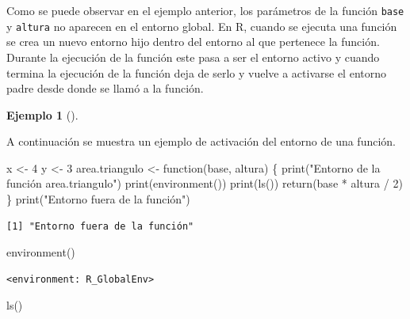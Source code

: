\documentclass[
  a4paper,
]{scrreport}
\newenvironment{Shaded}{\begin{snugshade}}{\end{snugshade}}
\newcommand{\ControlFlowTok}[1]{\textcolor[rgb]{0.00,0.23,0.31}{#1}}
\newcommand{\DecValTok}[1]{\textcolor[rgb]{0.68,0.00,0.00}{#1}}
\newcommand{\FunctionTok}[1]{\textcolor[rgb]{0.28,0.35,0.67}{#1}}
\newcommand{\NormalTok}[1]{\textcolor[rgb]{0.00,0.23,0.31}{#1}}
\newcommand{\OtherTok}[1]{\textcolor[rgb]{0.00,0.23,0.31}{#1}}
\newcommand{\SpecialCharTok}[1]{\textcolor[rgb]{0.37,0.37,0.37}{#1}}
\newcommand{\StringTok}[1]{\textcolor[rgb]{0.13,0.47,0.30}{#1}}
\theoremstyle{definition}
\newtheorem{example}{Ejemplo}[chapter]
\theoremstyle{definition}
\theoremstyle{remark}
\begin{document}
Como se puede observar en el ejemplo anterior, los parámetros de la
función \texttt{base} y \texttt{altura} no aparecen en el entorno
global. En R, cuando se ejecuta una función se crea un nuevo entorno
hijo dentro del entorno al que pertenece la función. Durante la
ejecución de la función este pasa a ser el entorno activo y cuando
termina la ejecución de la función deja de serlo y vuelve a activarse el
entorno padre desde donde se llamó a la función.

\leavevmode{}%
\begin{example}[]\label{exm-activacion-entorno-funcion}

A continuación se muestra un ejemplo de activación del entorno de una
función.

\begin{Shaded}
\begin{Highlighting}[]
\NormalTok{x }\OtherTok{\textless{}{-}} \DecValTok{4}
\NormalTok{y }\OtherTok{\textless{}{-}} \DecValTok{3}
\NormalTok{area.triangulo }\OtherTok{\textless{}{-}} \ControlFlowTok{function}\NormalTok{(base, altura) \{}
  \FunctionTok{print}\NormalTok{(}\StringTok{"Entorno de la función area.triangulo"}\NormalTok{) }
  \FunctionTok{print}\NormalTok{(}\FunctionTok{environment}\NormalTok{())}
  \FunctionTok{print}\NormalTok{(}\FunctionTok{ls}\NormalTok{())}
  \FunctionTok{return}\NormalTok{(base }\SpecialCharTok{*}\NormalTok{ altura }\SpecialCharTok{/} \DecValTok{2}\NormalTok{)}
\NormalTok{\}}
\FunctionTok{print}\NormalTok{(}\StringTok{"Entorno fuera de la función"}\NormalTok{)}
\end{Highlighting}
\end{Shaded}

\begin{verbatim}
[1] "Entorno fuera de la función"
\end{verbatim}

\begin{Shaded}
\begin{Highlighting}[]
\FunctionTok{environment}\NormalTok{()}
\end{Highlighting}
\end{Shaded}

\begin{verbatim}
<environment: R_GlobalEnv>
\end{verbatim}

\begin{Shaded}
\begin{Highlighting}[]
\FunctionTok{ls}\NormalTok{()}
\end{Highlighting}
\end{Shaded}


\end{example}
\end{document}
